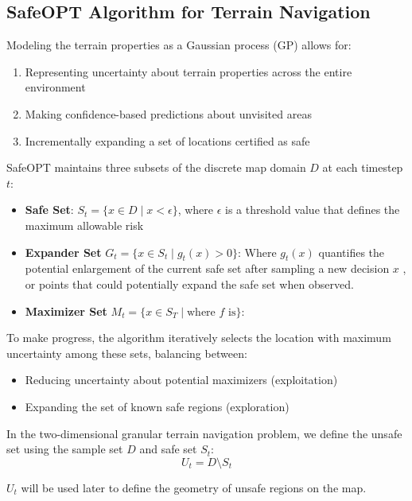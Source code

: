 \subsection{SafeOPT Algorithm for Terrain Navigation}
Modeling the terrain properties as a Gaussian process (GP) allows for:
\begin{enumerate}
    \item Representing uncertainty about terrain properties across the entire environment
    \item Making confidence-based predictions about unvisited areas
    \item Incrementally expanding a set of locations certified as safe
\end{enumerate}
SafeOPT maintains three subsets of the discrete map domain $D$ at each timestep $t$: 
\begin{itemize}
    \item \textbf{Safe Set}: $S_t = \{ x \in D \mid x < \epsilon \}$, where $\epsilon$ is a threshold value that defines the maximum allowable risk
    \item \textbf{Expander Set} $G_t = \{ x \in S_t \mid g_t(x) > 0 \}$: Where $g_t(x)$ quantifies the potential enlargement of the current safe set after sampling a new decision $x$ \cite{safeopt}, or points that could potentially expand the safe set when observed.
    \item \textbf{Maximizer Set} $M_t = \{ x \in S_T \mid \text{where $f$ is} \}$: \cite{safeopt}
\end{itemize}
To make progress, the algorithm iteratively selects the location with maximum uncertainty among these sets, balancing between:
\begin{itemize}
    \item Reducing uncertainty about potential maximizers (exploitation)
    \item Expanding the set of known safe regions (exploration)
\end{itemize}
In the two-dimensional granular terrain navigation problem, we define the unsafe set using the sample set $D$ and safe set $S_t$:
\[ U_t = D \setminus S_t \]

$U_t$ will be used later to define the geometry of unsafe regions on the map.




